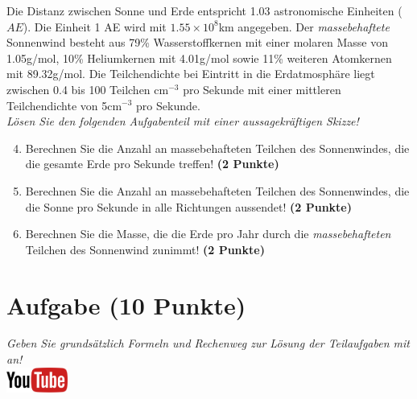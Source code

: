 \documentclass[a4paper, 9pt]{scrartcl}\usepackage[]{graphicx}\usepackage[]{xcolor}
\begin{document}
Die Distanz zwischen Sonne und Erde entspricht 1.03 astronomische Einheiten ($AE$). Die Einheit 1 AE wird mit \ensuremath{1.55\times 10^{8}}km angegeben. Der \textit{massebehaftete} Sonnenwind besteht aus 79\% Wasserstoffkernen mit einer molaren Masse von 1.05g/mol, 10\% Heliumkernen mit 4.01g/mol sowie 11\% weiteren Atomkernen mit  89.32g/mol. Die Teilchendichte bei Eintritt in die Erdatmosphäre liegt zwischen 0.4 bis 100 Teilchen cm$^{-3}$ pro Sekunde mit einer mittleren Teilchendichte von 5cm$^{-3}$ pro Sekunde. \\

\textit{Lösen Sie den folgenden Aufgabenteil mit einer aussagekräftigen Skizze!}

\begin{enumerate}
  \setcounter{enumi}{3}
\item Berechnen Sie die Anzahl an massebehafteten Teilchen des Sonnenwindes, die die gesamte Erde pro Sekunde treffen! \textbf{(2 Punkte)}
\item Berechnen Sie die Anzahl an massebehafteten Teilchen des Sonnenwindes, die die Sonne pro Sekunde in alle Richtungen aussendet! \textbf{(2 Punkte)}
\item Berechnen Sie die Masse, die die Erde pro Jahr durch die \textit{massebehafteten} Teilchen des Sonnenwind zunimmt! \textbf{(2 Punkte)}
\end{enumerate}


\clearpage

\section{Aufgabe \hfill (10 Punkte)}

\textit{Geben Sie grunds{\"a}tzlich Formeln und Rechenweg zur L{\"o}sung der
  Teilaufgaben mit an!} \\[1Ex]

\hfill\href{https://youtu.be/n451XnhtSh4}{\includegraphics[width = 2cm]{img/youtube}} %
\hspace{2Ex}
\end{document}
